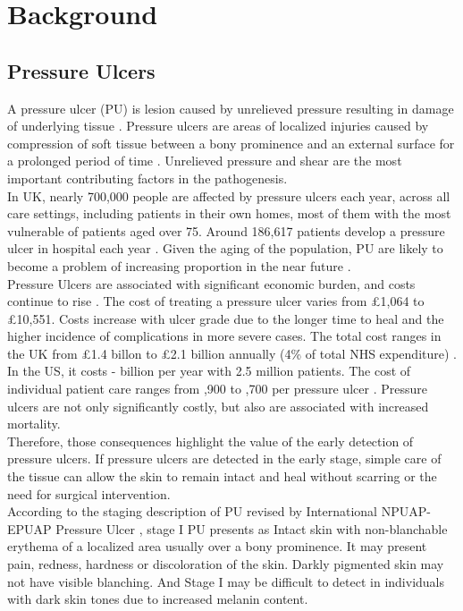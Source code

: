 \chapter{Background}
\section{Pressure Ulcers}
A pressure ulcer (PU) is lesion caused by unrelieved pressure resulting in damage of underlying tissue \cite{Wikipedia}. Pressure ulcers are areas of localized injuries caused by compression of soft tissue between a bony prominence and an external surface for a prolonged period of time \cite{Treatment}. Unrelieved pressure and shear are the most important contributing factors in the pathogenesis.\\

In UK, nearly 700,000 people are affected by pressure ulcers each year, across all care settings, including patients in their own homes, most of them with the most vulnerable of patients aged over 75. Around 186,617 patients develop a pressure ulcer in hospital each year \cite{NHS}. Given the aging of the population, PU are likely to become a problem of increasing proportion in the near future \cite{Maklebust}.\\

Pressure Ulcers are associated with significant economic burden, and costs continue to rise \cite{Allman}. The cost of treating a pressure ulcer varies from \pounds 1,064 to \pounds 10,551. Costs increase with ulcer grade due to the longer time to heal and the higher incidence of complications in more severe cases. The total cost ranges in the UK from \pounds 1.4 billon to \pounds 2.1 billion annually (4\% of total NHS expenditure) \cite{Bennett}. In the US, it costs  - billion per year with 2.5 million patients. The cost of individual patient care ranges from ,900 to ,700 per pressure ulcer \cite{HumanService}. Pressure ulcers are not only significantly costly, but also are associated with increased mortality.\\

Therefore, those consequences highlight the value of the early detection of pressure ulcers. If pressure ulcers are detected in the early stage, simple care of the tissue can allow the skin to remain intact and heal without scarring or the need for surgical intervention. \\

According to the staging description of PU revised by International NPUAP- EPUAP Pressure Ulcer \cite{epuap}, stage I PU presents as Intact skin with non-blanchable erythema of a localized area usually over a bony prominence. It may present pain, redness, hardness or discoloration of the skin. Darkly pigmented skin may not have visible blanching. And Stage I may be difficult to detect in individuals with dark skin tones due to increased melanin content. 

